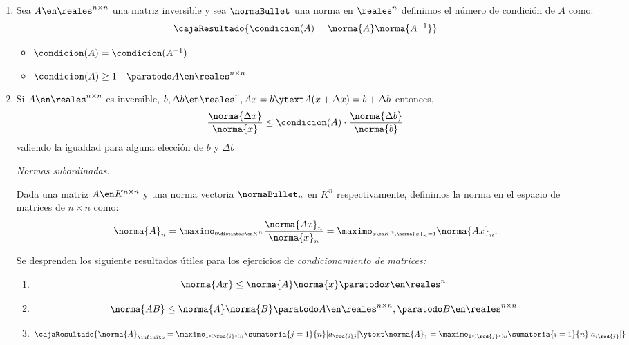 \begin{enumerate}[label=\tiny\purple{\faIcon{snowman}}]
  \item Sea $A \en \reales^{n \times n}$ una matriz inversible y sea $\normaBullet$ una norma en
        $\reales^n$ definimos el número de condición de $A$ como:
        $$
          \cajaResultado{
            \condicion(A) = \norma{A}\norma{A^{-1}}
          }
        $$
        \begin{itemize}
          \item $\condicion(A) = \condicion(A^{-1})$
          \item $\condicion(A) \geq 1 \quad \paratodo A \en \reales^{n \times n}$
        \end{itemize}
  \item Si $A \en \reales^{n \times n}$ es inversible, $b, \Delta b \en \reales^{n}, Ax = b \ytext A(x + \Delta x) = b + \Delta b$ entonces,
        $$
          \frac{\norma{\Delta x}}{\norma{x}} \leq \condicion(A) \cdot \frac{\norma{\Delta b}}{\norma{b}}
        $$
        valiendo la igualdad para alguna elección de $b$ y $\Delta b$

        \textit{Normas subordinadas}.

        Dada una matriz $A \en K^{n \times n}$ y una norma vectoria $\normaBullet_n$ en $K^n$
        respectivamente, definimos la norma en el espacio de matrices de $n \times n$ como:
        $$
          \norma{A}_n =
          \maximo_{\scriptscriptstyle 0 \distinto x \en K^n} \frac{ \norma{Ax}_n}{\norma{x}_n} =
          \maximo_{\scriptscriptstyle x \en K^n, \norma{x}_n = 1} \norma{Ax}_n.
        $$

        Se desprenden los siguiente resultados útiles para los ejercicios de \textit{condicionamiento de matrices:}
        \begin{enumerate}[label=\purple{\faIcon{gamepad}$_{\arabic*)}$}]
          \item
                $$
                  \norma{Ax} \leq \norma{A} \norma{x} \paratodo x \en \reales^n
                $$
          \item
                $$
                  \norma{AB} \leq \norma{A} \norma{B} \paratodo A \en \reales^{n \times n}, \paratodo B \en \reales^{n \times n}
                $$
          \item
                $$
                  \cajaResultado{
                  \norma{A}_\infinito = \maximo_{1\leq \red{i} \leq n} \sumatoria{j=1}{n}|a_{\red{i}j}|
                  \ytext
                  \norma{A}_1 = \maximo_{1\leq \red{j} \leq n} \sumatoria{i=1}{n}|a_{i\red{j}}|
                  }
                $$
        \end{enumerate}
\end{enumerate}

